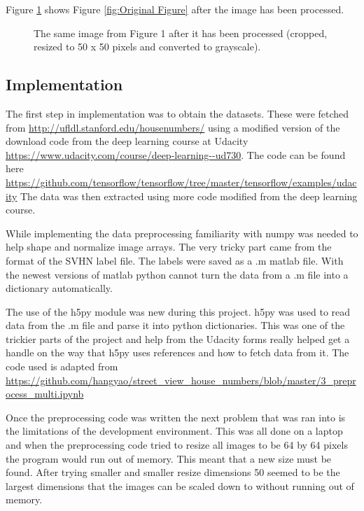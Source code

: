 \documentclass[12pt,twocolumn,letterpaper]{article}
\begin{document}
Figure \ref{fig:Processed Figure} shows Figure \ref{fig:Original Figure} after the image has been processed.

\begin{figure}[t]
\begin{center}
\end{center}
   \caption{The same image from Figure 1 after it has been processed (cropped, 
   			resized to 50 x 50 pixels and converted to grayscale). }
\label{fig:Processed Figure}
\end{figure}

\subsection{Implementation}
The first step in implementation was to obtain the datasets. These were fetched 
from \url{http://ufldl.stanford.edu/housenumbers/} using a modified version of 
the download code from the deep learning course at Udacity 
\url{https://www.udacity.com/course/deep-learning--ud730}. The code can be found here
\url{https://github.com/tensorflow/tensorflow/tree/master/tensorflow/examples/udacity} The data was then 
extracted using more code modified from the deep learning course. 

While implementing the data preprocessing familiarity with numpy was needed to help 
shape and normalize image arrays. The very tricky part came from the format of 
the SVHN label file. The labels were saved as a .m matlab file. With the newest 
versions of matlab python cannot turn the data from a .m file into a dictionary 
automatically. 

The use of the h5py module was new during this project. h5py was used to read 
data from the .m file and parse it into python dictionaries. This was one of the 
trickier parts of the project and help from the Udacity forms really helped get 
a handle on the way that h5py uses references and how to fetch data from it. The 
code used is adapted from \url{https://github.com/hangyao/street_view_house_numbers/blob/master/3_preprocess_multi.ipynb}

Once the preprocessing code was written the next problem that was ran into is the
limitations of the development environment. This was all done on a laptop and when the 
preprocessing code tried to resize all images to be 64 by 64 pixels the program 
would run out of memory. This meant that a new size must be found. After trying 
smaller and smaller resize dimensions 50 seemed to be the largest dimensions that 
the images can be scaled down to without running out of memory.
\end{document}
